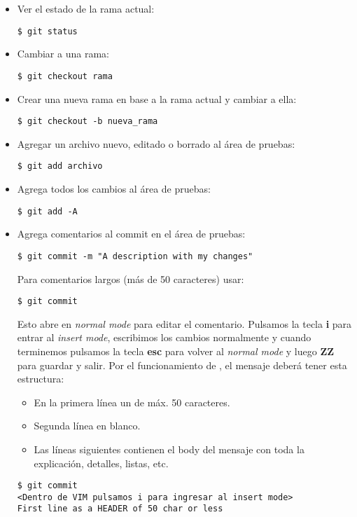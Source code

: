 \begin{itemize}[label=-]

\item Ver el estado de la rama actual:
\begin{lstlisting}
$ git status
\end{lstlisting}

\item Cambiar a una rama:
\begin{lstlisting}
$ git checkout rama
\end{lstlisting}

\item Crear una nueva rama en base a la rama actual y cambiar a ella:
\begin{lstlisting}
$ git checkout -b nueva_rama
\end{lstlisting}

\item Agregar un archivo nuevo, editado o borrado al área de pruebas:
\begin{lstlisting}
$ git add archivo
\end{lstlisting}

\item Agrega todos los cambios al área de pruebas:
\begin{lstlisting}
$ git add -A
\end{lstlisting}

\item Agrega comentarios al commit en el área de pruebas:
\begin{lstlisting}
$ git commit -m "A description with my changes"
\end{lstlisting}
Para comentarios largos (más de 50 caracteres) usar:
\begin{lstlisting}
$ git commit
\end{lstlisting}
Esto abre  en \textit{normal mode} para editar el comentario. Pulsamos la tecla \textbf{i} para entrar al \textit{insert mode}, escribimos los cambios normalmente y cuando terminemos pulsamos la tecla \textbf{esc} para volver al \textit{normal mode} y luego \textbf{ZZ} para guardar y salir. Por el funcionamiento de , el mensaje deberá tener esta estructura:
\begin{itemize}
\item En la primera línea un  de máx. 50 caracteres.
\item Segunda línea en blanco.
\item Las líneas siguientes contienen el body del mensaje con toda la explicación, detalles, listas, etc.
\end{itemize}
\begin{lstlisting}
$ git commit
<Dentro de VIM pulsamos i para ingresar al insert mode>
First line as a HEADER of 50 char or less


\end{lstlisting}
\end{itemize}
